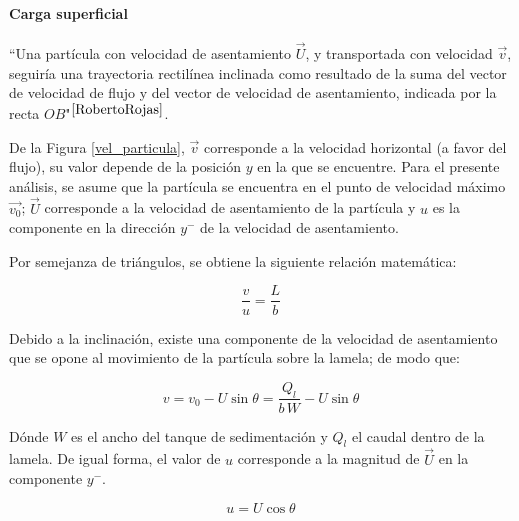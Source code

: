 \paragraph{Carga superficial} \label{carga}

\noindent
\justify

``Una part\'icula con velocidad de asentamiento $\vec{U}$, y transportada con velocidad $\vec{v}$, seguir\'ia una trayectoria rectil\'inea inclinada como resultado de la suma del vector de velocidad de flujo y del vector de velocidad de asentamiento, indicada por la recta $OB$"$^{\cite{RobertoRojas}}$.



\noindent
\justify

De la Figura \ref{vel_particula}, $\vec{v}$ corresponde a la velocidad horizontal (a favor del flujo), su valor depende de la posici\'on $y$ en la que se encuentre. Para el presente an\'alisis, se asume que la part\'icula se encuentra en el punto de velocidad m\'aximo $\vec{v_0}$; $\vec{U}$ corresponde a la velocidad de asentamiento de la part\'icula y $u$ es la componente en la direcci\'on $y^{-}$ de la velocidad de asentamiento.

\noindent
\justify

Por semejanza de tri\'angulos, se obtiene la siguiente relaci\'on matem\'atica:

\begin{equation}
	\frac{v}{u} = \frac{L}{b}
	\label{triS}
\end{equation}

\noindent
\justify

Debido a la inclinaci\'on, existe una componente de la velocidad de asentamiento que se opone al movimiento de la part\'icula sobre la lamela; de modo que:

\begin{equation}
	v = v_0 - U \sin \theta = \frac{Q _l}{b \, W} - U \sin \theta
	\label{v}
\end{equation}

\noindent
\justify

D\'onde $W$ es el ancho del tanque de sedimentaci\'on y $Q_l$ el caudal dentro de la lamela. De igual forma, el valor de $u$ corresponde a la magnitud de $\vec{U}$ en la componente $y^{-}$.

\begin{equation}
	u = U \cos \theta
	\label{u}
\end{equation}

\noindent
\justify


